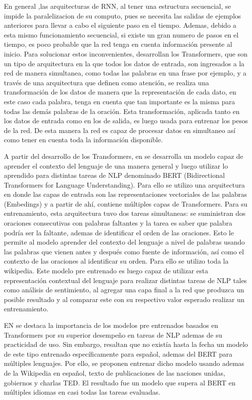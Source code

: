 En general ,las arquitecturas de RNN, al tener una estructura secuencial, se impide la paralelizacion de su computo, pues se necesita las salidas de ejemplos anteriores para llevar a cabo el siguiente paso en el tiempo. Ademas, debido a esta mismo funcionamiento secuencial, si existe un gran numero de pasos en el tiempo, es poco probable que la red tenga en cuenta información presente al inicio. Para solucionar estos inconvenientes, \cite{vaswani2017attention} desarrollan los Transformers, que son un tipo de arquitectura en la que todos los datos de entrada, son ingresados a la red de manera simultanea, como todas las palabras en una frase por ejemplo, y a través de una arquitectura que definen como atención, se realiza una transformación de los datos de manera que la representación de cada dato, en este caso cada palabra, tenga en cuenta que tan importante es la misma para todas las demás palabras de la oración. Esta transformación, aplicada tanto en los datos de entrada como en los de salida, es luego usada para entrenar los pesos de la red. De esta manera la red es capaz de procesar datos en simultaneo así como tener en cuenta toda la información disponible.
 

A partir del desarrollo de los Transformers, en  \cite{devlin2018bert} se desarrolla un modelo capaz de aprender el contexto del lenguaje de una manera general y luego utilizar lo aprendido para distintas tareas de NLP denominado BERT (Bidirectional Transformers for Language Understanding). Para ello se utilizo una arquitectura en donde las capas de entrada son las representaciones vectoriales de las palabras (Embedings) y a partir de ahí, contiene múltiples capas de Transformers. Para su entrenamiento, esta arquitectura tuvo dos tareas simultaneas: se suministran dos oraciones consecutivas con palabras faltantes y la tarea es saber que palabra podría ser la faltante, ademas de identificar el orden de las oraciones. Esto le permite al modelo aprender del contexto del lenguaje a nivel de palabras usando las palabras que vienen antes y después como fuente de información, así como el contexto de las oraciones al identificar su orden. Para ello se utilizo toda la wikipedia. Este modelo pre entrenado es luego capaz de utilizar esta representación contextual del lenguaje para realizar distintas tareas de NLP tales como análisis de sentimiento, al agregar una capa final a la red que produzca un posible resultado y al comparar este con su respectivo valor esperado realizar un entrenamiento.

EN \cite{canete2020spanish} se destaca la importancia de los modelos pre entrenados basados en Transformers por su superior desempeño en tareas de NLP ademas de su practicidad de uso. Sin embargo, resaltan que no existía hasta la fecha un modelo de este tipo entrenado específicamente para español, ademas del BERT para múltiples lenguajes. Por ello, se proponen entrenar dicho modelo usando ademas de la Wikipedia en español, texto de publicaciones de las naciones unidas, gobiernos y charlas TED. El resultado fue un modelo que supera al BERT en múltiples idiomas en casi todas las tareas evaluadas.




